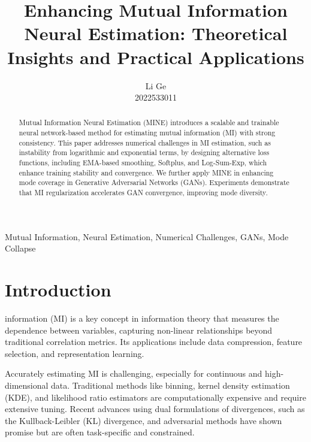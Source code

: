 \documentclass[lettersize,journal]{IEEEtran}
\begin{document}
\title{Enhancing Mutual Information Neural Estimation: Theoretical Insights and Practical Applications}

\author{Li Ge \\2022533011}

%
{}

\maketitle

\begin{abstract}
Mutual Information Neural Estimation (MINE) introduces a scalable and trainable neural network-based method for estimating mutual information (MI) with strong consistency. This paper addresses numerical challenges in MI estimation, such as instability from logarithmic and exponential terms, by designing alternative loss functions, including EMA-based smoothing, Softplus, and Log-Sum-Exp, which enhance training stability and convergence.
We further apply MINE in enhancing mode coverage in Generative Adversarial Networks (GANs). Experiments demonstrate that MI regularization accelerates GAN convergence, improving mode diversity.
\end{abstract}

\begin{IEEEkeywords}
Mutual Information, Neural Estimation, Numerical Challenges, GANs, Mode Collapse
\end{IEEEkeywords}

\section{Introduction}
 information (MI) is a key concept in information theory that measures the dependence between variables, capturing non-linear relationships beyond traditional correlation metrics. Its applications include data compression, feature selection, and representation learning.

Accurately estimating MI is challenging, especially for continuous and high-dimensional data. Traditional methods like binning, kernel density estimation (KDE), and likelihood ratio estimators are computationally expensive and require extensive tuning. Recent advances using dual formulations of divergences, such as the Kullback-Leibler (KL) divergence, and adversarial methods have shown promise but are often task-specific and constrained.
\end{document}
